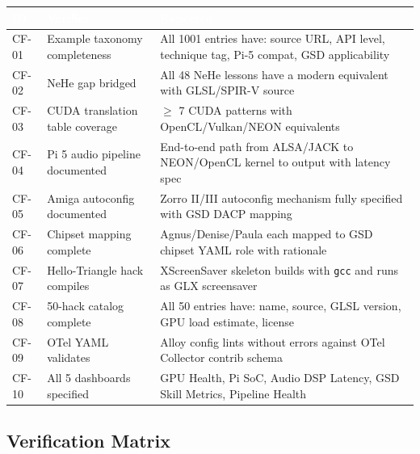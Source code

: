 \documentclass[11pt,letterpaper]{article}
\newcommand{\tableheader}[1]{\textbf{\sffamily\textcolor{white}{#1}}}
\begin{document}
\begin{center}
\begin{tabularx}{\textwidth}{C{1.5cm}XL{5cm}}
\toprule
{}
\tableheader{ID} & \tableheader{Verifies} & \tableheader{Expected} \\
\midrule
CF-01 & Example taxonomy completeness & All 1001 entries have: source URL, API level, technique tag, Pi-5 compat, GSD applicability \\
CF-02 & NeHe gap bridged & All 48 NeHe lessons have a modern equivalent with GLSL/SPIR-V source \\
CF-03 & CUDA translation table coverage & $\geq$ 7 CUDA patterns with OpenCL/Vulkan/NEON equivalents \\
CF-04 & Pi 5 audio pipeline documented & End-to-end path from ALSA/JACK to NEON/OpenCL kernel to output with latency spec \\
CF-05 & Amiga autoconfig documented & Zorro II/III autoconfig mechanism fully specified with GSD DACP mapping \\
CF-06 & Chipset mapping complete & Agnus/Denise/Paula each mapped to GSD chipset YAML role with rationale \\
CF-07 & Hello-Triangle hack compiles & XScreenSaver skeleton builds with \texttt{gcc} and runs as GLX screensaver \\
CF-08 & 50-hack catalog complete & All 50 entries have: name, source, GLSL version, GPU load estimate, license \\
CF-09 & OTel YAML validates & Alloy config lints without errors against OTel Collector contrib schema \\
CF-10 & All 5 dashboards specified & GPU Health, Pi SoC, Audio DSP Latency, GSD Skill Metrics, Pipeline Health \\
\bottomrule
\end{tabularx}
\end{center}

\subsection{Verification Matrix}
\end{document}
